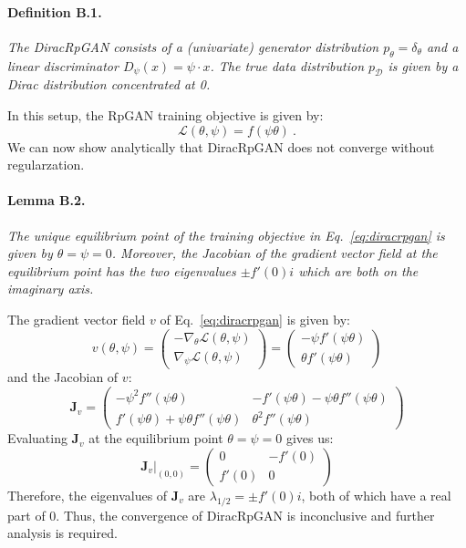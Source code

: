 \paragraph{Definition B.1.} \emph{The DiracRpGAN consists of a (univariate) generator distribution $p_{\theta} = \delta_{\theta}$ and a linear discriminator $D_{\psi}(x) = \psi \cdot x$. The true data distribution $p_{\mathcal{D}}$ is given by a Dirac distribution concentrated at 0.}

In this setup, the RpGAN training objective is given by:
\begin{equation}
\label{eq:diracrpgan}
    \mathcal{L}(\theta, \psi) = f(\psi \theta)\ .
\end{equation}
We can now show analytically that DiracRpGAN does not converge without regularzation.

\paragraph{Lemma B.2.} \emph{The unique equilibrium point of the training objective in Eq.~\ref{eq:diracrpgan} is given by $\theta = \psi = 0$. Moreover, the Jacobian of the gradient vector field at the equilibrium point has the two eigenvalues $\pm f'(0)i$ which are both on the imaginary axis.}

The gradient vector field $v$ of Eq.~\ref{eq:diracrpgan} is given by:
\begin{equation}
    v(\theta, \psi) =
    \begin{pmatrix}
    -\nabla_{\theta} \mathcal{L}(\theta, \psi) \\
    \nabla_{\psi} \mathcal{L}(\theta, \psi)
    \end{pmatrix} =
    \begin{pmatrix}
    -\psi f'(\psi \theta) \\
    \theta f'(\psi \theta)
    \end{pmatrix}
\end{equation}
and the Jacobian of $v$:
\begin{equation}
    \textbf{J}_v =
    \begin{pmatrix}
    -\psi^2 f''(\psi\theta) & -f'(\psi\theta) - \psi\theta f''(\psi\theta) \\
    f'(\psi\theta) + \psi\theta f''(\psi\theta) & \theta^2 f''(\psi\theta)
    \end{pmatrix}
\end{equation}
Evaluating $\textbf{J}_v$ at the equilibrium point $\theta = \psi = 0$ gives us:
\begin{equation}
    \textbf{J}_v \biggr\rvert_{(0,0)} =
    \begin{pmatrix}
    0 & -f'(0) \\
    f'(0) & 0
    \end{pmatrix}
\end{equation}
Therefore, the eigenvalues of $\textbf{J}_v$ are $\lambda_{1/2} = \pm f'(0) i$, both of which have a real part of 0. Thus, the convergence of DiracRpGAN is inconclusive and further analysis is required.


